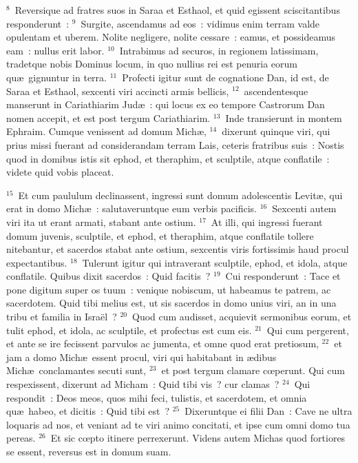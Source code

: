 ${}^{8}$~Reversique ad fratres suos in Saraa et Esthaol, et quid egissent sciscitantibus responderunt~:
${}^{9}$~Surgite, ascendamus ad eos~: vidimus enim terram valde opulentam et uberem. Nolite negligere, nolite cessare~: eamus, et possideamus eam~: nullus erit labor.
${}^{10}$~Intrabimus ad securos, in regionem latissimam, tradetque nobis Dominus locum, in quo nullius rei est penuria eorum qu\ae\ gignuntur in terra.
${}^{11}$~Profecti igitur sunt de cognatione Dan, id est, de Saraa et Esthaol, sexcenti viri accincti armis bellicis,
${}^{12}$~ascendentesque manserunt in Cariathiarim Jud\ae~: qui locus ex eo tempore Castrorum Dan nomen accepit, et est post tergum Cariathiarim.
${}^{13}$~Inde transierunt in montem Ephraim. Cumque venissent ad domum Mich\ae ,
${}^{14}$~dixerunt quinque viri, qui prius missi fuerant ad considerandam terram Lais, ceteris fratribus suis~: Nostis quod in domibus istis sit ephod, et theraphim, et sculptile, atque conflatile~: videte quid vobis placeat.


${}^{15}$~Et cum paululum declinassent, ingressi sunt domum adolescentis Levit\ae , qui erat in domo Mich\ae~: salutaveruntque eum verbis pacificis.
${}^{16}$~Sexcenti autem viri ita ut erant armati, stabant ante ostium.
${}^{17}$~At illi, qui ingressi fuerant domum juvenis, sculptile, et ephod, et theraphim, atque conflatile tollere nitebantur, et sacerdos stabat ante ostium, sexcentis viris fortissimis haud procul expectantibus.
${}^{18}$~Tulerunt igitur qui intraverant sculptile, ephod, et idola, atque conflatile. Quibus dixit sacerdos~: Quid facitis~?
${}^{19}$~Cui responderunt~: Tace et pone digitum super os tuum~: venique nobiscum, ut habeamus te patrem, ac sacerdotem. Quid tibi melius est, ut sis sacerdos in domo unius viri, an in una tribu et familia in Isra\"el~?
${}^{20}$~Quod cum audisset, acquievit sermonibus eorum, et tulit ephod, et idola, ac sculptile, et profectus est cum eis.
${}^{21}$~Qui cum pergerent, et ante se ire fecissent parvulos ac jumenta, et omne quod erat pretiosum,
${}^{22}$~et jam a domo Mich\ae\ essent procul, viri qui habitabant in \ae dibus Mich\ae\ conclamantes secuti sunt,
${}^{23}$~et post tergum clamare cœperunt. Qui cum respexissent, dixerunt ad Micham~: Quid tibi vis~? cur clamas~?
${}^{24}$~Qui respondit~: Deos meos, quos mihi feci, tulistis, et sacerdotem, et omnia qu\ae\ habeo, et dicitis~: Quid tibi est~?
${}^{25}$~Dixeruntque ei filii Dan~: Cave ne ultra loquaris ad nos, et veniant ad te viri animo concitati, et ipse cum omni domo tua pereas.
${}^{26}$~Et sic cœpto itinere perrexerunt. Videns autem Michas quod fortiores se essent, reversus est in domum suam.


